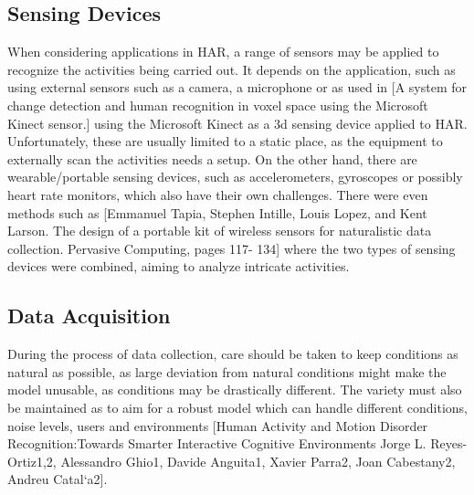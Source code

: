 
\subsection{Sensing Devices}
When considering applications in HAR,  a range of sensors may be applied to recognize the activities being carried out.  It depends on the application, such as using external sensors such as a camera, a microphone or as used in [A system for change detection and human
recognition in voxel space using the Microsoft Kinect sensor.] using the Microsoft Kinect as a 3d sensing device applied to HAR. Unfortunately, these are usually limited to a static place, as the equipment to externally scan the activities needs a setup. On the other hand, 
there are wearable/portable sensing devices, such as accelerometers, gyroscopes or possibly heart rate monitors, which also have their own challenges. There were even methods such as 
[Emmanuel Tapia, Stephen Intille, Louis Lopez, and Kent Larson. The design of a portable kit of wireless sensors for naturalistic data collection. Pervasive Computing, pages 117-
134] where the two types of sensing devices were combined, aiming to analyze intricate activities.
\subsection{Data Acquisition}

During the process of data collection, care should be taken to keep conditions as natural as possible, as large deviation from 
natural conditions might make the model unusable, as conditions may be drastically different. The variety must also be maintained as to aim for a robust model 
which can handle different conditions, noise levels, users and environments 
[Human Activity and Motion Disorder Recognition:Towards Smarter Interactive Cognitive Environments Jorge L. Reyes-Ortiz1,2, Alessandro Ghio1, Davide Anguita1, Xavier Parra2, 
Joan Cabestany2, Andreu Catal`a2]. 


